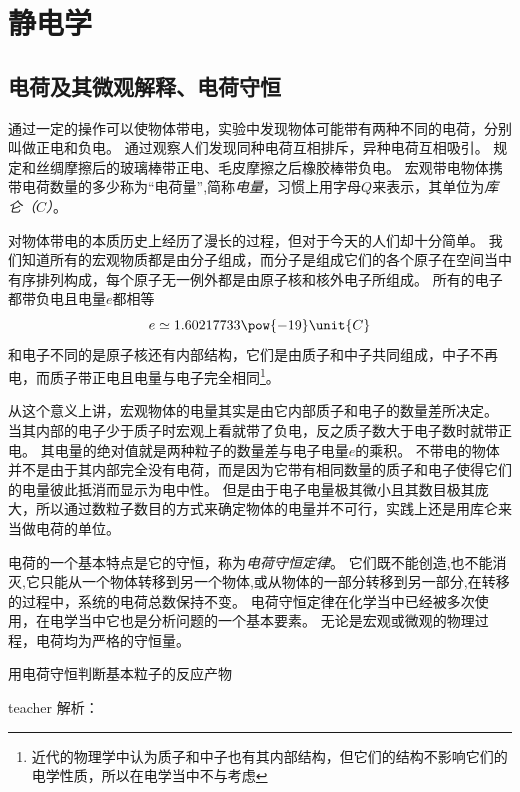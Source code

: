 
\chapter{静电学}

\section{电荷及其微观解释、电荷守恒}

通过一定的操作可以使物体带电，实验中发现物体可能带有两种不同的电荷，分别叫做正电和负电。
通过观察人们发现同种电荷互相排斥，异种电荷互相吸引。
规定和丝绸摩擦后的玻璃棒带正电、毛皮摩擦之后橡胶棒带负电。
宏观带电物体携带电荷数量的多少称为“电荷量”,简称\emph{电量}，习惯上用字母$Q$来表示，其单位为\emph{库仑（$C$）}。

对物体带电的本质历史上经历了漫长的过程，但对于今天的人们却十分简单。
我们知道所有的宏观物质都是由分子组成，而分子是组成它们的各个原子在空间当中有序排列构成，每个原子无一例外都是由原子核和核外电子所组成。
所有的电子都带负电且电量$e$都相等
\begin{equation}
e\simeq 1.60217733\pow{-19}\unit{C}
\end{equation}
和电子不同的是原子核还有内部结构，它们是由质子和中子共同组成，中子不再电，而质子带正电且电量与电子完全相同\footnote{近代的物理学中认为质子和中子也有其内部结构，但它们的结构不影响它们的电学性质，所以在电学当中不与考虑}。

从这个意义上讲，宏观物体的电量其实是由它内部质子和电子的数量差所决定。
当其内部的电子少于质子时宏观上看就带了负电，反之质子数大于电子数时就带正电。
其电量的绝对值就是两种粒子的数量差与电子电量$e$的乘积。
不带电的物体并不是由于其内部完全没有电荷，而是因为它带有相同数量的质子和电子使得它们的电量彼此抵消而显示为电中性。
但是由于电子电量极其微小且其数目极其庞大，所以通过数粒子数目的方式来确定物体的电量并不可行，实践上还是用库仑来当做电荷的单位。

电荷的一个基本特点是它的守恒，称为\emph{电荷守恒定律}。
它们既不能创造,也不能消灭,它只能从一个物体转移到另一个物体,或从物体的一部分转移到另一部分,在转移的过程中，系统的电荷总数保持不变。
电荷守恒定律在化学当中已经被多次使用，在电学当中它也是分析问题的一个基本要素。
无论是宏观或微观的物理过程，电荷均为严格的守恒量。

\begin{example}
用电荷守恒判断基本粒子的反应产物
\begin{taggedblock}{teacher}
\newline
解析：
\end{taggedblock}
\end{example}

